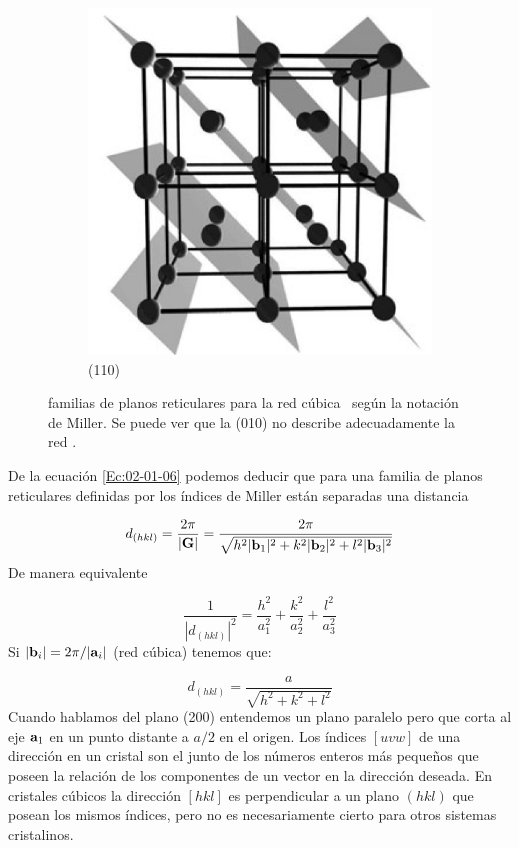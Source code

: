 \begin{figure}[h!]
\begin{subfigure}{0.3\linewidth}
		\includegraphics[scale=0.18]{Cuerpo/Ch_02/110-bcc.png}
		\caption{(110)}
	\end{subfigure}
	\caption{familias de planos reticulares para la red cúbica \bcc \ según la notación de Miller. Se puede ver que la (010) no describe adecuadamente la red \bcc.}
\end{figure}


De la ecuación \ref{Ec:02-01-06} podemos deducir que para una familia de planos reticulares definidas por los índices de Miller están separadas una distancia 

\begin{equation}
	d_{(hkl)} = \frac{2\pi}{|\mathbf{G}|} = \frac{2\pi}{\sqrt{h^2|\mathbf{b}_1|^2+k^2|\mathbf{b}_2|^2+l^2|\mathbf{b}_3|^2}}
\end{equation}
De manera equivalente

\begin{equation}
	\frac{1}{|d_{(hkl)}|^2} = \frac{h^2}{a_1^2}+ \frac{k^2}{a_2^2}+ \frac{l^2}{a_3^2}
\end{equation}
Si $|\mathbf{b}_i|=2\pi / |\mathbf{a}_i|$ (red cúbica) tenemos que:

\begin{equation}
	d_{(hkl)} =  \frac{a}{\sqrt{h^2 + k^2 + l^2}}
\end{equation}
Cuando hablamos del plano (200) entendemos un plano paralelo pero que corta al eje $\mathbf{a}_1$ en un punto distante a $a/2$ en el origen. Los índices $[uvw]$ de una dirección en un cristal son el junto de los números enteros más pequeños que poseen la relación de los componentes de un vector en la dirección deseada. En cristales cúbicos la dirección $[hkl]$ es perpendicular a un plano $(hkl)$ que posean los mismos índices, pero no es necesariamente cierto para otros sistemas cristalinos.

